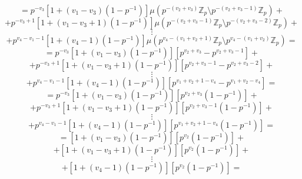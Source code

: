 \documentclass{article}
\begin{document}
\[
=p^{-v_3}[1+(v_1-v_3)(1-p^{-1})]\mu(p^{-(v_2+v_3)}\mathbb{Z}_p\setminus{p^{-(v_2+v_3-1)}\mathbb{Z}_p})+\]
\[+p^{-v_3+1}[1+(v_1-v_3+1)(1-p^{-1})]\mu(p^{-(v_2+v_3-1)}\mathbb{Z}_p\setminus{p^{-(v_2+v_3-2)}\mathbb{Z}_p})+\]
\[\vdots\]
\[+p^{v_4-v_1-1}[1+(v_4-1)(1-p^{-1})]\mu(p^{v_4-(v_1+v_2+1)}\mathbb{Z}_p\setminus{p^{v_4-(v_1+v_2)}\mathbb{Z}_p})=
\]
\[
=p^{-v_3}[1+(v_1-v_3)(1-p^{-1})][p^{v_2+v_3}-p^{v_2+v_3-1}]+\]
\[+p^{-v_3+1}[1+(v_1-v_3+1)(1-p^{-1})][p^{v_2+v_3-1}-p^{v_2+v_3-2}]+\]
\[\vdots\]
\[+p^{v_4-v_1-1}[1+(v_4-1)(1-p^{-1})][p^{v_1+v_2+1-v_4}-p^{v_1+v_2-v_4}]=
\]
\[
=p^{-v_3}[1+(v_1-v_3)(1-p^{-1})][p^{v_2+v_3}(1-p^{-1})]+\]
\[+p^{-v_3+1}[1+(v_1-v_3+1)(1-p^{-1})][p^{v_2+v_3-1}(1-p^{-1})]+\]
\[\vdots\]
\[+p^{v_4-v_1-1}[1+(v_4-1)(1-p^{-1})][p^{v_1+v_2+1-v_4}(1-p^{-1})]=
\]
\[
=[1+(v_1-v_3)(1-p^{-1})][p^{v_2}(1-p^{-1})]+\]
\[+[1+(v_1-v_3+1)(1-p^{-1})][p^{v_2}(1-p^{-1})]+\]
\[\vdots\]
\[+[1+(v_4-1)(1-p^{-1})][p^{v_2}(1-p^{-1})]=
\]
\end{document}
